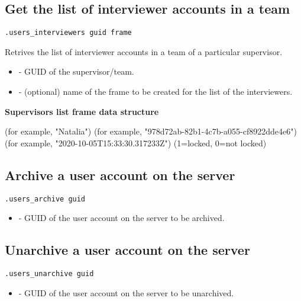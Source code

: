 \subsection{Get the list of interviewer accounts in a team}
\begin{lstlisting}[style=CommandLineStyle]
.users_interviewers guid frame
\end{lstlisting}
Retrives the list of interviewer accounts in a team of a particular supervisor.

\paramsheader
\begin{itemize}
  \item {} - GUID of the supervisor/team.
  \item {} - (optional) name of the frame to be created for the list of the interviewers.
\end{itemize}

\textbf{Supervisors list frame data structure}

\begin{compactitem}
     (for example, "Natalia")
     (for example, "978d72ab-82b1-4c7b-a055-cf8922dde4e6")
     (for example, "2020-10-05T15:33:30.317233Z")
     (1=locked, 0=not locked)
\end{compactitem}


\subsection{Archive a user account on the server}
\begin{lstlisting}[style=CommandLineStyle]
.users_archive guid
\end{lstlisting}

\paramsheader
\begin{itemize}
      \item {} - GUID of the user account on the server to be archived.
\end{itemize}


\subsection{Unarchive a user account on the server}
\begin{lstlisting}[style=CommandLineStyle]
.users_unarchive guid
\end{lstlisting}

\paramsheader
\begin{itemize}
      \item {} - GUID of the user account on the server to be unarchived.
\end{itemize}


